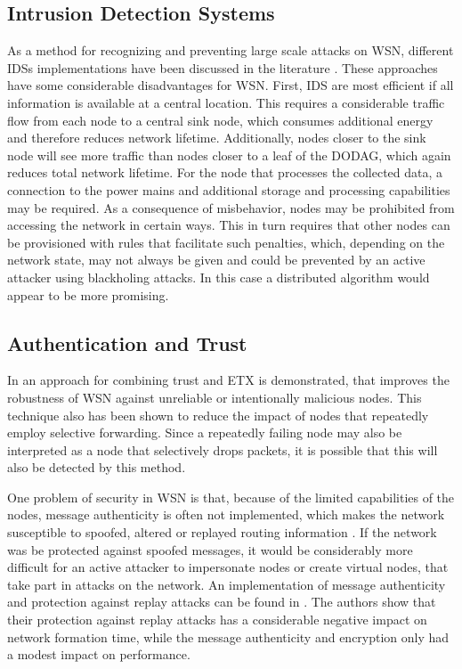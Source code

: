 \subsection{Intrusion Detection Systems}

As a method for recognizing and preventing large scale attacks on \ac{WSN}, different \acfp{IDS} implementations have been discussed in the literature \cite{le2011specification,raza2013svelte,kasinathan2013denial}.
These approaches have some considerable disadvantages for \ac{WSN}.
First, \ac{IDS} are most efficient if all information is available at a central location.
This requires a considerable traffic flow from each node to a central sink node, which consumes additional energy and therefore reduces network lifetime.
Additionally, nodes closer to the sink node will see more traffic than nodes closer to a leaf of the \ac{DODAG}, which again reduces total network lifetime.
For the node that processes the collected data, a connection to the power mains and additional storage and processing capabilities may be required.
As a consequence of misbehavior, nodes may be prohibited from accessing the network in certain ways.
This in turn requires that other nodes can be provisioned with rules that facilitate such penalties, which, depending on the network state, may not always be given and could be prevented by an active attacker using blackholing attacks.
In this case a distributed algorithm would appear to be more promising.

\subsection{Authentication and Trust}

In \cite{kantert2016combining} an approach for combining trust and \ac{ETX} is demonstrated, that improves the robustness of \ac{WSN} against unreliable or intentionally malicious nodes.
This technique also has been shown to reduce the impact of nodes that repeatedly employ selective forwarding.
Since a repeatedly failing node may also be interpreted as a node that selectively drops packets, it is possible that this will also be detected by this method.

One problem of security in \ac{WSN} is that, because of the limited capabilities of the nodes, message authenticity is often not implemented, which makes the network susceptible to spoofed, altered or replayed routing information \cite{karlof2003secure}.
If the network was be protected against spoofed messages, it would be considerably more difficult for an active attacker to impersonate nodes or create virtual nodes, that take part in attacks on the network.
An implementation of message authenticity and protection against replay attacks can be found in \cite{perazzo2017implementation}.
The authors show that their protection against replay attacks has a considerable negative impact on network formation time, while the message authenticity and encryption only had a modest impact on performance.

